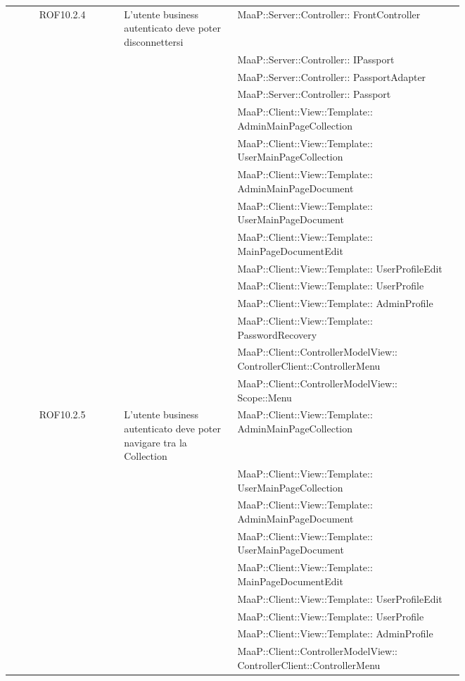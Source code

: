 \begin{center}
\begin{longtable}{|c|p{0.25\linewidth}|p{0.5\linewidth}|}
\midrule
ROF10.2.4
& L'utente business autenticato deve poter disconnettersi
& MaaP::Server::Controller:: FrontController\\
& & MaaP::Server::Controller:: IPassport\\
& & MaaP::Server::Controller:: PassportAdapter\\
& & MaaP::Server::Controller:: Passport\\
& & MaaP::Client::View::Template:: AdminMainPageCollection\\
& & MaaP::Client::View::Template:: UserMainPageCollection\\
& & MaaP::Client::View::Template:: AdminMainPageDocument\\
& & MaaP::Client::View::Template:: UserMainPageDocument\\
& & MaaP::Client::View::Template:: MainPageDocumentEdit\\
& & MaaP::Client::View::Template:: UserProfileEdit\\
& & MaaP::Client::View::Template:: UserProfile\\
& & MaaP::Client::View::Template:: AdminProfile\\
& & MaaP::Client::View::Template:: PasswordRecovery\\
& & MaaP::Client::ControllerModelView:: ControllerClient::ControllerMenu\\
& & MaaP::Client::ControllerModelView:: Scope::Menu\\

\midrule
ROF10.2.5
& L'utente business autenticato deve poter navigare tra la Collection
& MaaP::Client::View::Template:: AdminMainPageCollection\\
& & MaaP::Client::View::Template:: UserMainPageCollection\\
& & MaaP::Client::View::Template:: AdminMainPageDocument\\
& & MaaP::Client::View::Template:: UserMainPageDocument\\
& & MaaP::Client::View::Template:: MainPageDocumentEdit\\
& & MaaP::Client::View::Template:: UserProfileEdit\\
& & MaaP::Client::View::Template:: UserProfile\\
& & MaaP::Client::View::Template:: AdminProfile\\
& & MaaP::Client::ControllerModelView:: ControllerClient::ControllerMenu\\


\end{longtable}
\end{center}
